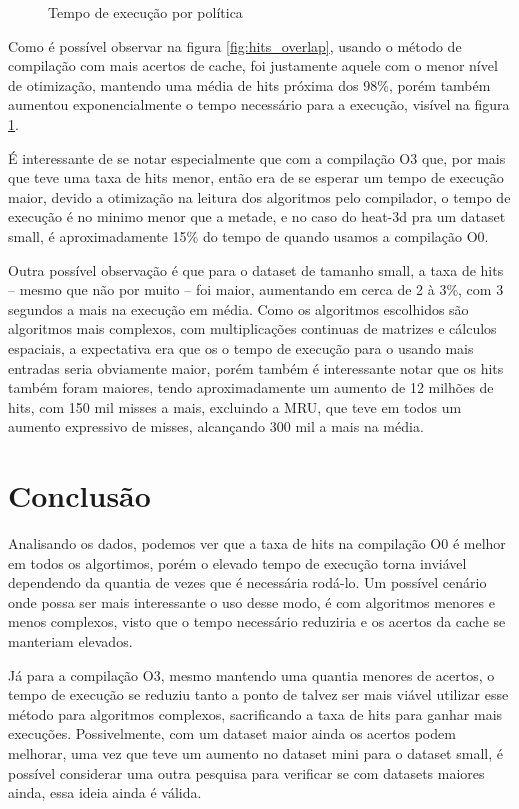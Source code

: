 \documentclass[12pt]{article}
\begin{document}
\begin{figure}[H]
\begin{tikzpicture}
    \end{tikzpicture}
    \caption{Tempo de execução por política}
    \label{fig:exec_overlap}
    \end{figure}

    Como é possível observar na figura \ref{fig:hits_overlap}, usando o método 
    de compilação com mais acertos de cache, foi justamente aquele com o menor 
    nível de otimização, mantendo uma média de hits próxima dos 98\%, porém 
    também aumentou exponencialmente o tempo necessário para a execução, visível 
    na figura \ref{fig:exec_overlap}. 
    
    É interessante de se notar especialmente que com a compilação O3 que, por mais 
    que teve uma taxa de hits menor, então era de se esperar um tempo de execução 
    maior, devido a otimização na leitura dos algoritmos pelo compilador, o 
    tempo de execução é no minimo menor que a metade, e no caso do heat-3d pra 
    um dataset small, é aproximadamente 15\% do tempo de quando usamos a 
    compilação O0. 

    Outra possível observação é que para o dataset de tamanho small, a taxa de 
    hits -- mesmo que não por muito -- foi maior, aumentando em cerca de 2 à 3\%, 
    com 3 segundos a mais na execução em média. Como os algoritmos escolhidos 
    são algoritmos mais complexos, com multiplicações continuas de matrizes e 
    cálculos espaciais, a expectativa era que os o tempo de execução para o 
    usando mais entradas seria obviamente maior, porém também é interessante 
    notar que os hits também foram maiores, tendo aproximadamente um aumento de 
    12 milhões de hits, com 150 mil misses a mais, excluindo a MRU, que teve em 
    todos um aumento expressivo de misses, alcançando 300 mil a mais na média.

\section{Conclusão}
Analisando os dados, podemos ver que a taxa de hits na compilação O0 é melhor em 
todos os algortimos, porém o elevado tempo de execução torna inviável dependendo 
da quantia de vezes que é necessária rodá-lo. Um possível cenário onde possa ser 
mais interessante o uso desse modo, é com algoritmos menores e menos complexos, 
visto que o tempo necessário reduziria e os acertos da cache se manteriam elevados.

Já para a compilação O3, mesmo mantendo uma quantia menores de acertos, o tempo 
de execução se reduziu tanto a ponto de talvez ser mais viável utilizar esse 
método para algoritmos complexos, sacrificando a taxa de hits para ganhar mais 
execuções. Possivelmente, com um dataset maior ainda os acertos podem melhorar, 
uma vez que teve um aumento no dataset mini para o dataset small, é possível 
considerar uma outra pesquisa para verificar se com datasets maiores ainda, 
essa ideia ainda é válida.   
    



\end{document}
